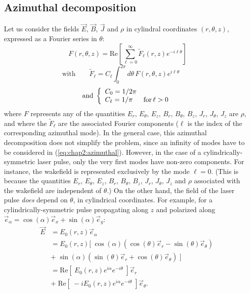 \documentclass[]{report}
\begin{document}
\subsection{Azimuthal decomposition}
Let us consider the fields $\vec{E}$, $\vec{B}$, $\vec{J}$ and $\rho$
 in cylindral coordinates $(r,\theta,z)$, expressed as a Fourier series in $\theta$:
%
\begin{equation}
F(r,\theta,z) = \mathrm{Re}\left[ \sum_{\ell=0}^\infty
  \tilde{F}_{\ell}(r,z) e^{-i\ell\theta} \right] 
\label{eq:chap2:azimuthal}
\end{equation}
%
\begin{equation}
\mathrm{with} \qquad \tilde{F}_{\ell} = C_\ell \int_0^{2\pi} d\theta
\,F(r,\theta,z)e^{i\ell\theta} \qquad 
\label{eq:chap2:Fourier-coeffs}
\end{equation}
\begin{equation}
\mathrm{and} \;
\left \{ \begin{array}{l l}
C_{0} = 1/2\pi &\\
C_\ell = 1/\pi &\mathrm{for}\,\ell > 0
\end{array} \right.
\end{equation}
%
where $F$ represents any of the quantities $E_r$,
$E_\theta$, $E_z$, $B_r$, $B_\theta$, $B_z$, $J_r$, $J_\theta$, $J_z$
are $\rho$, and where the
$\tilde{F}_\ell$ are the associated Fourier components ($\ell$ is the
index of the corresponding azimuthal mode). In the general case, this
azimuthal decomposition does not simplify the problem, since an
infinity of modes have to be considered in (\ref{eq:chap2:azimuthal}). However, in the case of a
cylindrically-symmetric laser pulse, only the very first modes have
non-zero components. For instance, the wakefield is represented
exclusively by the mode $\ell = 0$. (This is because the quantities $E_r$,
$E_\theta$, $E_z$, $B_r$, $B_\theta$, $B_z$, $J_r$, $J_\theta$, $J_z$
and $\rho$ associated with the
wakefield are independent of $\theta$.) On the other hand, the field
of the laser pulse \emph{does}
depend on $\theta$, in cylindrical coordinates. For example, for a
cylindrically-symmetric pulse propagating along $z$ and polarized along $\vec{e}_\alpha = \cos(\alpha)\vec{e}_x + \sin(\alpha)\vec{e}_y$:
%
\begin{align}
\vec{E} &= E_0(r,z)\vec{e}_\alpha \\
& = E_0(r,z) [\; \cos(\alpha)(\cos(\theta)\vec{e}_r - \sin(\theta)\vec{e}_\theta) \; \nonumber \\ 
& + \; \sin(\alpha)(\sin(\theta)\vec{e}_r + \cos(\theta)\vec{e}_\theta) \; ]\\
& = \mathrm{Re}[ \; E_0(r,z) e^{i\alpha} e^{-i\theta} \; ]\vec{e}_r \; \nonumber \\
& + \; \mathrm{Re}[ \; -i E_0(r,z) e^{i\alpha} e^{-i\theta} \; ]\vec{e}_\theta.
\end{align}
\end{document}

